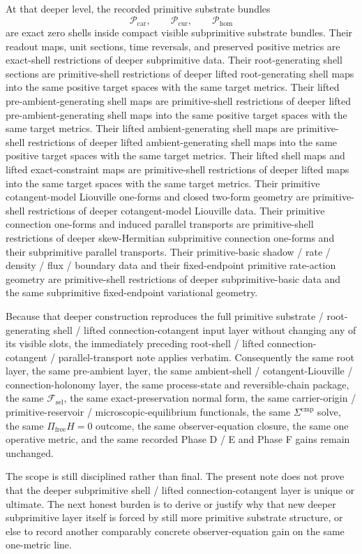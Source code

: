 \documentclass[11pt]{article}
\newcommand{\StemFunctional}{\mathscr F_{\mathrm{sel}}}
\newcommand{\TensorPrimitiveSpace}{\mathcal P_{\mathrm{car}}}
\newcommand{\CurPrimitiveSpace}{\mathcal P_{\mathrm{cur}}}
\newcommand{\HomPrimitiveSpace}{\mathcal P_{\mathrm{hom}}}
\begin{document}
At that deeper level, the recorded primitive substrate bundles
\[
\TensorPrimitiveSpace,\qquad
\CurPrimitiveSpace,\qquad
\HomPrimitiveSpace
\]
are exact zero shells inside compact visible subprimitive substrate bundles. Their readout maps, unit sections, time reversals, and preserved positive metrics are exact-shell restrictions of deeper subprimitive data. Their root-generating shell sections are primitive-shell restrictions of deeper lifted root-generating shell maps into the same positive target spaces with the same target metrics. Their lifted pre-ambient-generating shell maps are primitive-shell restrictions of deeper lifted pre-ambient-generating shell maps into the same positive target spaces with the same target metrics. Their lifted ambient-generating shell maps are primitive-shell restrictions of deeper lifted ambient-generating shell maps into the same positive target spaces with the same target metrics. Their lifted shell maps and lifted exact-constraint maps are primitive-shell restrictions of deeper lifted maps into the same target spaces with the same target metrics. Their primitive cotangent-model Liouville one-forms and closed two-form geometry are primitive-shell restrictions of deeper cotangent-model Liouville data. Their primitive connection one-forms and induced parallel transports are primitive-shell restrictions of deeper skew-Hermitian subprimitive connection one-forms and their subprimitive parallel transports. Their primitive-basic shadow / rate / density / flux / boundary data and their fixed-endpoint primitive rate-action geometry are primitive-shell restrictions of deeper subprimitive-basic data and the same subprimitive fixed-endpoint variational geometry.

Because that deeper construction reproduces the full primitive substrate / root-generating shell / lifted connection-cotangent input layer without changing any of its visible slots, the immediately preceding root-shell / lifted connection-cotangent / parallel-transport note applies verbatim. Consequently the same root layer, the same pre-ambient layer, the same ambient-shell / cotangent-Liouville / connection-holonomy layer, the same process-state and reversible-chain package, the same \(\StemFunctional\), the same exact-preservation normal form, the same carrier-origin / primitive-reservoir / microscopic-equilibrium functionals, the same \(\Sigma^{\mathrm{cmp}}\) solve, the same \(\Pi_{\mathrm{free}}H=0\) outcome, the same observer-equation closure, the same one operative metric, and the same recorded Phase D / E and Phase F gains remain unchanged.

The scope is still disciplined rather than final. The present note does not prove that the deeper subprimitive shell / lifted connection-cotangent layer is unique or ultimate. The next honest burden is to derive or justify why that new deeper subprimitive layer itself is forced by still more primitive substrate structure, or else to record another comparably concrete observer-equation gain on the same one-metric line.
\end{document}
